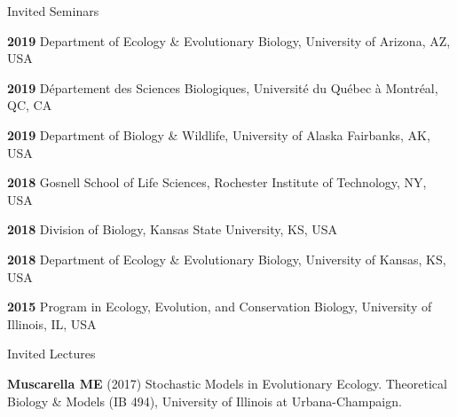\documentclass{resume} %
\begin{document}
\begin{rSection}{Invited Seminars}

  {\bf 2019} Department of Ecology \& Evolutionary Biology, University of Arizona, AZ, USA

  {\bf 2019} D\'epartement des Sciences Biologiques, Universit\'e du Qu\'ebec \`a Montr\'eal, QC, CA
  
  {\bf 2019} Department of Biology \& Wildlife, University of Alaska Fairbanks, AK, USA

  {\bf 2018} Gosnell School of Life Sciences, Rochester Institute of Technology, NY, USA

  {\bf 2018} Division of Biology, Kansas State University, KS, USA

  {\bf 2018}  Department of Ecology \& Evolutionary Biology, University of Kansas, KS, USA

  {\bf 2015} Program in Ecology, Evolution, and Conservation Biology, University of Illinois, IL, USA

\end{rSection}


\begin{rSection}{Invited Lectures}

  {\bf Muscarella ME} (2017) Stochastic Models in Evolutionary Ecology.
	Theoretical Biology \& Models (IB 494), University of Illinois at Urbana-Champaign.

\end{rSection}
\end{document}

